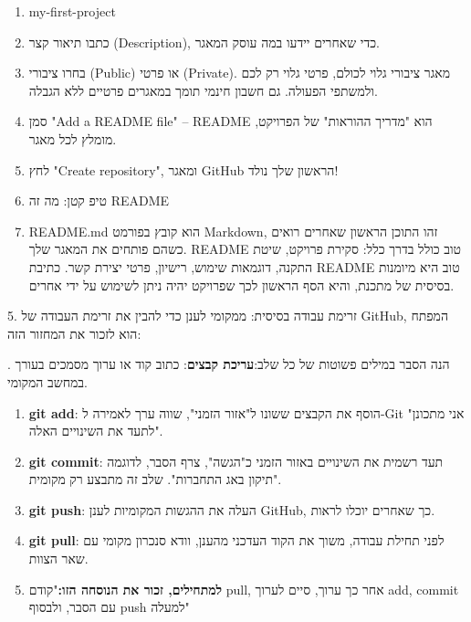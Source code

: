 \begin{enumerate}
  \item my-first-project
  \item כתבו תיאור קצר (Description), כדי שאחרים יידעו במה עוסק המאגר.
  \item בחרו ציבורי (Public) או פרטי (Private). מאגר ציבורי גלוי לכולם, פרטי גלוי רק לכם ולמשתפי הפעולה. גם חשבון חינמי תומך במאגרים פרטיים ללא הגבלה.
  \item סמן "Add a README file" – README הוא "מדריך ההוראות" של הפרויקט, מומלץ לכל מאגר.
  \item לחץ "Create repository", ומאגר GitHub הראשון שלך נולד!
  \item טיפ קטן: מה זה README
  \item README.md הוא קובץ בפורמט Markdown, זהו התוכן הראשון שאחרים רואים כשהם פותחים את המאגר שלך. README טוב כולל בדרך כלל: סקירת פרויקט, שיטת התקנה, דוגמאות שימוש, רישיון, פרטי יצירת קשר. כתיבת README טוב היא מיומנות בסיסית של מתכנת, והיא הסף הראשון לכך שפרויקט יהיה ניתן לשימוש על ידי אחרים.
\end{enumerate}

\begin{tcbinfo}{5. זרימת עבודה בסיסית: ממקומי לענן}
כדי להבין את זרימת העבודה של GitHub, המפתח הוא לזכור את המחזור הזה:

\end{tcbinfo}


. הנה הסבר במילים פשוטות של כל שלב:\textbf{עריכת קבצים}: כתוב קוד או ערוך מסמכים בעורך במחשב המקומי.

\begin{enumerate}
  \item \textbf{git add}: הוסף את הקבצים ששונו ל"אזור הזמני", שווה ערך לאמירה ל-Git "אני מתכונן לתעד את השינויים האלה".
  \item \textbf{git commit}: תעד רשמית את השינויים באזור הזמני כ"הגשה", צרף הסבר, לדוגמה "תיקון באג התחברות". שלב זה מתבצע רק מקומית.
  \item \textbf{git push}: העלה את ההגשות המקומיות לענן GitHub, כך שאחרים יוכלו לראות.
  \item \textbf{git pull}: לפני תחילת עבודה, משוך את הקוד העדכני מהענן, וודא סנכרון מקומי עם שאר הצוות.
  \item \textbf{למתחילים, זכור את הנוסחה הזו:}"קודם pull, אחר כך ערוך, סיים לערוך add, commit עם הסבר, ולבסוף push למעלה"
\end{enumerate}

